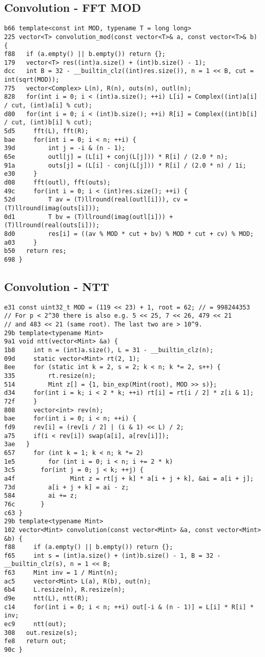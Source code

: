 \documentclass[10pt, a4paper, twoside]{article}
\begin{document}
\subsection{Convolution - FFT MOD}
\begin{lstlisting}
b66 template<const int MOD, typename T = long long>
225 vector<T> convolution_mod(const vector<T>& a, const vector<T>& b) {
f88   if (a.empty() || b.empty()) return {};
179   vector<T> res((int)a.size() + (int)b.size() - 1);
dcc   int B = 32 - __builtin_clz((int)res.size()), n = 1 << B, cut = int(sqrt(MOD));
775   vector<Complex> L(n), R(n), outs(n), outl(n);
828   for(int i = 0; i < (int)a.size(); ++i) L[i] = Complex((int)a[i] / cut, (int)a[i] % cut);
d80   for(int i = 0; i < (int)b.size(); ++i) R[i] = Complex((int)b[i] / cut, (int)b[i] % cut);
5d5 	fft(L), fft(R);
bae 	for(int i = 0; i < n; ++i) {
39d 		int j = -i & (n - 1);
65e 		outl[j] = (L[i] + conj(L[j])) * R[i] / (2.0 * n);
91a 		outs[j] = (L[i] - conj(L[j])) * R[i] / (2.0 * n) / 1i;
e30 	}
d08 	fft(outl), fft(outs);
49c 	for(int i = 0; i < (int)res.size(); ++i) {
52d 		T av = (T)llround(real(outl[i])), cv = (T)llround(imag(outs[i]));
0d1 		T bv = (T)llround(imag(outl[i])) + (T)llround(real(outs[i]));
8d0 		res[i] = ((av % MOD * cut + bv) % MOD * cut + cv) % MOD;
a03 	}
b50   return res;
698 }
\end{lstlisting}

\subsection{Convolution - NTT}
\begin{lstlisting}
e31 const uint32_t MOD = (119 << 23) + 1, root = 62; // = 998244353
// For p < 2^30 there is also e.g. 5 << 25, 7 << 26, 479 << 21
// and 483 << 21 (same root). The last two are > 10^9.
29b template<typename Mint>
9a1 void ntt(vector<Mint> &a) {
1b8 	int n = (int)a.size(), L = 31 - __builtin_clz(n);
09d 	static vector<Mint> rt(2, 1);
8ee 	for (static int k = 2, s = 2; k < n; k *= 2, s++) {
335 		rt.resize(n);
514 		Mint z[] = {1, bin_exp(Mint(root), MOD >> s)};
d34     for(int i = k; i < 2 * k; ++i) rt[i] = rt[i / 2] * z[i & 1];
72f 	}
808 	vector<int> rev(n);
bae 	for(int i = 0; i < n; ++i) {
fd9     rev[i] = (rev[i / 2] | (i & 1) << L) / 2;
a75     if(i < rev[i]) swap(a[i], a[rev[i]]);
3ae   }
657 	for (int k = 1; k < n; k *= 2)
1e5 		for (int i = 0; i < n; i += 2 * k) 
3c5       for(int j = 0; j < k; ++j) {
a4f 			  Mint z = rt[j + k] * a[i + j + k], &ai = a[i + j];
73d         a[i + j + k] = ai - z;
584         ai += z;
76c       }
c63 }
29b template<typename Mint>
102 vector<Mint> convolution(const vector<Mint> &a, const vector<Mint> &b) {
f88 	if (a.empty() || b.empty()) return {};
f65 	int s = (int)a.size() + (int)b.size() - 1, B = 32 - __builtin_clz(s), n = 1 << B;
f63 	Mint inv = 1 / Mint(n);
ac5 	vector<Mint> L(a), R(b), out(n);
6b4 	L.resize(n), R.resize(n);
d9e 	ntt(L), ntt(R);
c14 	for(int i = 0; i < n; ++i) out[-i & (n - 1)] = L[i] * R[i] * inv;
ec9 	ntt(out);
308   out.resize(s);
fe8   return out;
90c }
\end{lstlisting}
\end{document}
